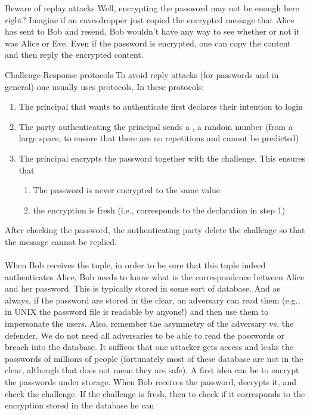\begin{parag}{Beware of replay attacks}
    Well, encrypting the password may not be enough here right? Imagine if an eavesdropper just copied the encrypted message that Alice has sent to Bob and resend, Bob wouldn't have any way to see whether or not it was Alice or Eve. Even if the password is encrypted, one can copy the content and then reply the encrypted content.
\end{parag}
\begin{parag}{Challenge-Response protocols}
    To avoid reply attacks (for passwords and in general) one usually uses  protocols. In these protocols:
	\begin{enumerate}
	    \item The principal that wants to authenticate first declares their intention to login
	    \item The party authenticating the principal sends a , a random number (from a large space, to ensure that there are no repetitions and cannot be predicted)
	    \item The principal encrypts the password together with the challenge. This ensures that 
			\begin{enumerate}
			    \item The password is never encrypted to the same value
			    \item the encryption is fresh (i.e., corresponds to the declaration in step 1)
			\end{enumerate}
	\end{enumerate}
	After checking the password, the authenticating party  delete the challenge so that the message cannot be replied.\\
	$ $\\
	When Bob receives the tuple, in order to be sure that this tuple indeed authenticates Alice, Bob needs to know what is the correspondence between Alice and her password. This is typically stored in some sort of database. And as always, if the password are stored in the clear, an adversary can read them (e.g., in UNIX the password file is readable by anyone!) and then use them to impersonate the users. Also, remember the asymmetry of the adversary vs. the defender. We do not need all adversaries to be able to read the passwords or breach into the database. It suffices that one attacker gets access and leaks the passwords of millions of people (fortunately most of these database are not in the clear, although that does not mean they are safe). A first idea can be to encrypt the passwords under storage. When Bob receives the password, decrypts it, and check the challenge. If the challenge is fresh, then to check if it corresponds to the encryption stored in the database he can 

\end{parag}
